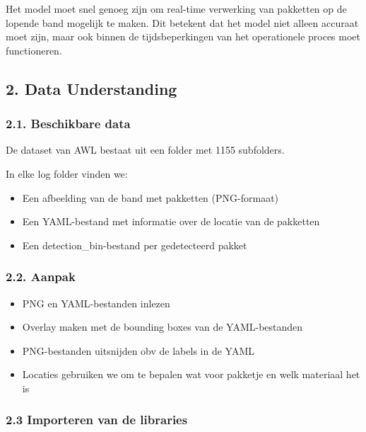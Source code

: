 \documentclass[11pt]{article}
\providecommand{\tightlist}{%
      \setlength{\itemsep}{0pt}\setlength{\parskip}{0pt}}
\begin{document}
Het model moet snel genoeg zijn om real-time verwerking van pakketten op
de lopende band mogelijk te maken. Dit betekent dat het model niet
alleen accuraat moet zijn, maar ook binnen de tijdsbeperkingen van het
operationele proces moet functioneren.

    \subsection{2. Data Understanding}\label{data-understanding}

\subsubsection{2.1. Beschikbare data}\label{beschikbare-data}

De dataset van AWL bestaat uit een folder met 1155 subfolders.

In elke log folder vinden we:

\begin{itemize}
\tightlist
\item
  Een afbeelding van de band met pakketten (PNG-formaat)
\item
  Een YAML-bestand met informatie over de locatie van de pakketten
\item
  Een detection\_bin-bestand per gedetecteerd pakket
\end{itemize}

\subsubsection{2.2. Aanpak}\label{aanpak}

\begin{itemize}
\tightlist
\item
  PNG en YAML-bestanden inlezen
\item
  Overlay maken met de bounding boxes van de YAML-bestanden
\item
  PNG-bestanden uitsnijden obv de labels in de YAML
\item
  Locaties gebruiken we om te bepalen wat voor pakketje en welk
  materiaal het is
\end{itemize}

    \subsubsection{2.3 Importeren van de
libraries}\label{importeren-van-de-libraries}
\end{document}
